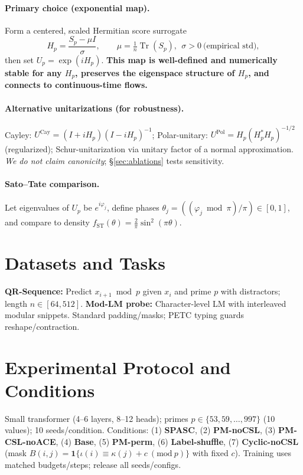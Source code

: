 \documentclass[11pt]{article}
\newcommand{\Tr}{\operatorname{Tr}}
\theoremstyle{definition}
\theoremstyle{remark}
\begin{document}
\paragraph{Primary choice (exponential map).}
Form a centered, scaled Hermitian score surrogate
\begin{equation}
  H_p=\frac{S_p-\mu I}{\sigma},\qquad \mu=\tfrac{1}{n}\Tr(S_p),\ \ \sigma>0~\text{(empirical std)},
\end{equation}
then set $U_p=\exp(iH_p)$. \textbf{This map is well-defined and numerically stable for any $H_p$, preserves the eigenspace structure of $H_p$, and connects to continuous-time flows.}
\paragraph{Alternative unitarizations (for robustness).}
Cayley: $U^{\mathrm{Cay}}=(I+iH_p)(I-iH_p)^{-1}$; Polar-unitary: $U^{\mathrm{Pol}} = H_p(H_p^\ast H_p)^{-1/2}$ (regularized); Schur-unitarization via unitary factor of a normal approximation. \emph{We do not claim canonicity}; \S\ref{sec:ablations} tests sensitivity.
\paragraph{Sato--Tate comparison.}
Let eigenvalues of $U_p$ be $e^{i\varphi_j}$, define phases $\theta_j = ((\varphi_j\bmod\pi)/\pi)\in[0,1]$, and compare to density $f_{\text{ST}}(\theta)=\tfrac{2}{\pi}\sin^2(\pi\theta)$.

\section{Datasets and Tasks}
\textbf{QR-Sequence:} Predict $x_{i+1}\bmod p$ given $x_i$ and prime $p$ with distractors; length $n\in[64,512]$. \textbf{Mod-LM probe:} Character-level LM with interleaved modular snippets. Standard padding/masks; PETC typing guards reshape/contraction.

\section{Experimental Protocol and Conditions}
\label{sec:protocol}
Small transformer (4--6 layers, 8--12 heads); primes $p\in\{53,59,\dots,997\}$ (10 values); 10 seeds/condition. Conditions: (1) \textbf{SPASC}, (2) \textbf{PM-noCSL}, (3) \textbf{PM-CSL-noACE}, (4) \textbf{Base}, (5) \textbf{PM-perm}, (6) \textbf{Label-shuffle}, (7) \textbf{Cyclic-noCSL} (mask $B(i,j)=\mathbf{1}\{\iota(i)\equiv\kappa(j)+c\ (\mathrm{mod}\ p)\}$ with fixed $c$).
Training uses matched budgets/steps; release all seeds/configs.
\end{document}
